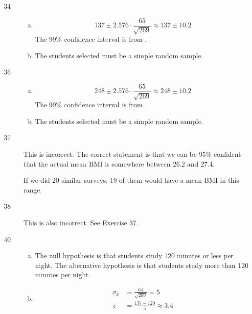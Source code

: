 \documentclass[letterpaper, landscape]{exam}
\begin{document}
  \ifprintanswers
    \begin{description}

      \item[34] 
        \begin{enumerate}[(a)]
          \item 
            \[
              137 \pm 2.576 \cdot \frac{65}{\sqrt{269}} \approx 137 \pm 10.2
            \]
            The 99\% confidence interval is from .

          \item The students selected must be a simple random sample.

        \end{enumerate}

      \item[36] 
        \begin{enumerate}[(a)]
          \item 
            \[
              248 \pm 2.576 \cdot \frac{65}{\sqrt{269}} \approx 248 \pm 10.2
            \]
            The 99\% confidence interval is from .

          \item The students selected must be a simple random sample.

        \end{enumerate}

      \item[37] This is incorrect. The correct statement is that we can be 95\%
        confident that the actual mean BMI is somewhere between 26.2 and 27.4.

        If we did 20 similar surveys, 19 of them would have a mean BMI in this
        range.

      \item[38] This is also incorrect. See Exercise 37.

      \item[40]
        \begin{enumerate}[(a)]
          \item The null hypothesis is that students study 120 minutes or less
            per night. The alternative hypothesis is that students study more
            than 120 minutes per night.

          \item
            \begin{align*}
              \sigma_{\bar{x}} & = \frac{64}{\sqrt{269}} = 5 \\
              z                & = \frac{137 - 120}{5} \approx 3.4
            \end{align*}


\end{enumerate}
\end{description}
\end{document}
